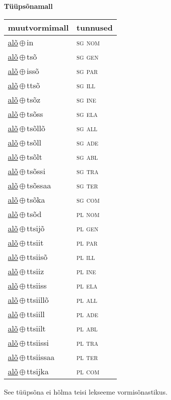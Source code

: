 

\vspace{3.5em}
\noindent \begin{minipage}{\textwidth}
\noindent \textbf{Tüüpsõnamall \,}\\

\begin{sideways}
\begin{tabular}{l l}
muutvormimall & tunnused \\
\hline
\underline{alõ}\,$\oplus$\,in & \textsc{ sg nom } \\
\underline{alõ}\,$\oplus$\,tsõ & \textsc{ sg gen } \\
\underline{alõ}\,$\oplus$\,issõ & \textsc{ sg par } \\
\underline{alõ}\,$\oplus$\,ttsõ & \textsc{ sg ill } \\
\underline{alõ}\,$\oplus$\,tsõz & \textsc{ sg ine } \\
\underline{alõ}\,$\oplus$\,tsõss & \textsc{ sg ela } \\
\underline{alõ}\,$\oplus$\,tsõllõ & \textsc{ sg all } \\
\underline{alõ}\,$\oplus$\,tsõll & \textsc{ sg ade } \\
\underline{alõ}\,$\oplus$\,tsõlt & \textsc{ sg abl } \\
\underline{alõ}\,$\oplus$\,tsõssi & \textsc{ sg tra } \\
\underline{alõ}\,$\oplus$\,tsõssaa & \textsc{ sg ter } \\
\underline{alõ}\,$\oplus$\,tsõka & \textsc{ sg com } \\
\underline{alõ}\,$\oplus$\,tsõd & \textsc{ pl nom } \\
\underline{alõ}\,$\oplus$\,ttsijõ & \textsc{ pl gen } \\
\underline{alõ}\,$\oplus$\,ttsiit & \textsc{ pl par } \\
\underline{alõ}\,$\oplus$\,ttsiisõ & \textsc{ pl ill } \\
\underline{alõ}\,$\oplus$\,ttsiiz & \textsc{ pl ine } \\
\underline{alõ}\,$\oplus$\,ttsiiss & \textsc{ pl ela } \\
\underline{alõ}\,$\oplus$\,ttsiillõ & \textsc{ pl all } \\
\underline{alõ}\,$\oplus$\,ttsiill & \textsc{ pl ade } \\
\underline{alõ}\,$\oplus$\,ttsiilt & \textsc{ pl abl } \\
\underline{alõ}\,$\oplus$\,ttsiissi & \textsc{ pl tra } \\
\underline{alõ}\,$\oplus$\,ttsiissaa & \textsc{ pl ter } \\
\underline{alõ}\,$\oplus$\,ttsijka & \textsc{ pl com } \\
\end{tabular}
\end{sideways}
\label{tab:tüüpsõnamall-alõin}

\end{minipage}

 
\vspace{1em}
\noindent See tüüpsõna ei hõlma teisi lekseeme vormi\-sõnastikus.
